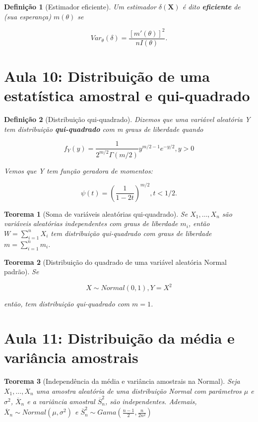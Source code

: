 \documentclass{article}
\newtheorem{theorem}{Teorema}
\newtheorem{definition}{Definição}
\begin{document}
\begin{definition}[Estimador eficiente]
Um estimador $\delta(\textbf{X})$ é dito \textbf{eficiente} de (sua esperança) $m(\theta)$ se

$$Var_\theta(\delta) = \frac{[m'(\theta)]^2}{n I(\theta)}.$$
\end{definition}

\section*{Aula 10: Distribuição de uma estatística amostral e qui-quadrado}
\label{s10}
\begin{definition}[Distribuição qui-quadrado]
Dizemos que uma variável aleatória Y tem distribuição \textbf{qui-quadrado} com m graus de liberdade quando

\begin{equation}
    f_Y(y) = \frac{1}{2^{m/2} \Gamma(m/2)} y^{m/2 - 1} e^{-y/2}, y > 0
\end{equation}

Vemos que Y tem função geradora de momentos:

$$\psi (t) = \left ( \frac{1}{1 - 2t} \right )^{m/2}, t < 1/2.$$
\end{definition}

\begin{theorem}[Soma de variáveis aleatórias qui-quadrado]
Se $X_1, \ldots, X_n$ são variáveis aleatórias independentes com graus de liberdade $m_i$, então $W = \sum_{i = 1}^n X_i$ tem distribuição qui-quadrado com graus de liberdade $m = \sum_{i = 1}^n m_i$.
\end{theorem}

\begin{theorem}[Distribuição do quadrado de uma variável aleatória Normal padrão]
Se 

$$X \sim Normal(0, 1), Y = X^2$$ 

então, tem distribuição qui-quadrado com $m = 1$.
\end{theorem}

\section*{Aula 11: Distribuição da média e variância amostrais}
\label{s11}
\begin{theorem}[Independência da média e variância amostrais na Normal]
Seja $X_1, \ldots, X_n$ uma amostra aleatória de uma distribuição Normal com parâmetros $\mu$ e $\sigma^2$, $\overline{X}_n$ e a variância amostral $\overline{S}_n^2$, são independentes. Ademais, $\overline{X}_n \sim Normal \left ( \mu, \sigma^2 \right )$ e $\overline{S}_n^2 \sim Gama \left ( \frac{n - 1}{2}, \frac{n}{2 n^2} \right )$
\end{theorem}
\end{document}
